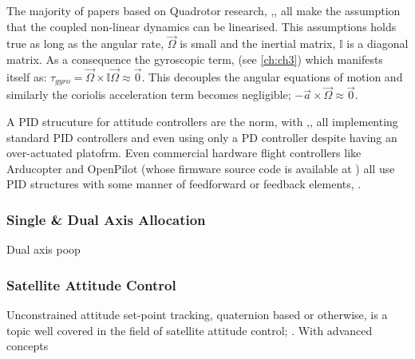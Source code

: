The majority of papers based on Quadrotor research, \cite{quaddynamics},\cite{optimizedPID}, \cite{fourrotorrobot} all make the assumption that the coupled non-linear dynamics can be linearised. This assumptions holds true as long as the angular rate, $\vec{\Omega}$ is small and the inertial matrix, $\mathbb{I}$ is a diagonal matrix. As a consequence the gyroscopic term, (see \ref{ch:ch3}) which manifests itself as: $\tau _{gyro} = \vec{\Omega} \times \mathbb{I} \vec{\Omega} \approx \vec{0}$. This decouples the angular equations of motion and similarly the coriolis acceleration term becomes negligible; $-\vec{a} \times \vec{\Omega} \approx \vec{0}$.
\par
A PID strucuture for attitude controllers are the norm, with \cite{optimizedPID},\cite{quaddynamics},\cite{tiltpropellerflight} all implementing standard PID controllers and even \cite{singleaxistilting} using only a PD controller despite having an over-actuated platofrm. Even commercial hardware flight controllers like Arducopter\cite{arducopter} and OpenPilot \cite{openpilot}(whose firmware source code is available at \cite{openpilotgit}) all use PID structures with some manner of feedforward or feedback elements, \cite{buildyourownquad}.

\subsubsection*{Single \& Dual Axis Allocation}
Dual axis poop

\subsubsection*{Satellite Attitude Control}
Unconstrained attitude set-point tracking, quaternion based or otherwise, is a topic well covered in the field of satellite attitude control; \cite{}. With advanced concepts  